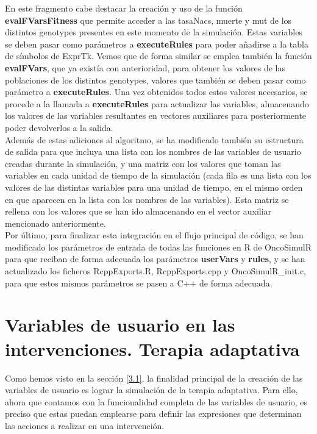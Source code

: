 En este fragmento cabe destacar la creación y uso de la función \textbf{evalFVarsFitness} que permite acceder a las \glspl{tasaNac}, muerte y \gls{mut} de los distintos \glspl{genotype} presentes en este momento de la simulación. Estas variables se deben pasar como parámetros a \textbf{executeRules} para poder añadirse a la tabla de símbolos de ExprTk\cite{Exprtk}.
Vemos que de forma similar se emplea también la función \textbf{evalFVars}, que ya existía con anterioridad, para obtener los valores de las poblaciones de los distintos \glspl{genotype}, valores que también se deben pasar como parámetro a \textbf{executeRules}.
Una vez obtenidos todos estos valores necesarios, se procede a la llamada a \textbf{executeRules} para actualizar las variables, almacenando los valores de las variables resultantes en vectores auxiliares para posteriormente poder devolverlos a la salida.\\
\indent Además de estas adiciones al algoritmo, se ha modificado también su estructura de salida para que incluya una lista con los nombres de las variables de usuario creadas durante la simulación, y una matriz con los valores que toman las variables en cada unidad de tiempo de la simulación (cada fila es una lista con los valores de las distintas variables para una unidad de tiempo, en el mismo orden en que aparecen en la lista con los nombres de las variables). Esta matriz se rellena con los valores que se han ido almacenando en el vector auxiliar mencionado anteriormente.\\
\indent Por último, para finalizar esta integración en el flujo principal de código, se han modificado los parámetros de entrada de todas las funciones en R de OncoSimulR\cite{OncoSimulR} para que reciban de forma adecuada los parámetros \textbf{userVars} y \textbf{rules}, y se han actualizado los ficheros RcppExports.R, RcppExports.cpp y OncoSimulR\_init.c, para que estos mismos parámetros se pasen a C++ de forma adecuada.

\section{Variables de usuario en las intervenciones. Terapia adaptativa}\label{4.6}

Como hemos visto en la sección \ref{3.1}, la finalidad principal de la creación de las variables de usuario es lograr la simulación de la terapia adaptativa. Para ello, ahora que contamos con la funcionalidad completa de las variables de usuario, es preciso que estas puedan emplearse para definir las expresiones que determinan las acciones a realizar en una intervención.

